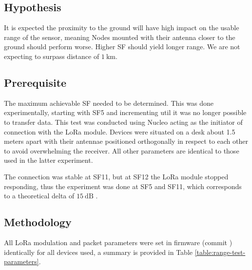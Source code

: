 \subsection{Hypothesis}
It is expected the proximity to the ground will have high impact on the usable range of the sensor, meaning Nodes mounted with their antenna closer to the ground should perform worse. Higher SF should yield longer range. We are not expecting to surpass distance of $1~\mathrm{km}$.

\subsection{\label{section:range-prerequisite}Prerequisite}
The maximum achievable SF needed to be determined. This was done experimentally, starting with SF5 and incrementing util it was no longer possible to transfer data. This test was conducted using Nucleo acting as the initiator of connection with the LoRa module. Devices were situated on a desk about 1.5 meters apart with their antennae positioned orthogonally in respect to each other to avoid overwhelming the receiver. All other parameters are identical to those used in the latter experiment.

The connection was stable at SF11, but at SF12 the LoRa module stopped responding, thus the experiment was done at SF5 and SF11, which corresponds to a theoretical delta of $15~\mathrm{dB}$ \cite{semtech_corporation_sx12612_2024}.

\subsection{Methodology}
All LoRa modulation and packet parameters were set in firmware (commit ) identically for all devices used, a summary is provided in Table \ref{table:range-test-parameters}. 

